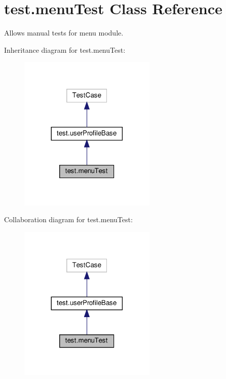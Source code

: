 \hypertarget{classtest_1_1menuTest}{}\section{test.\+menu\+Test Class Reference}
\label{classtest_1_1menuTest}


Allows manual tests for menu module.  




Inheritance diagram for test.\+menu\+Test\+:
\nopagebreak
\begin{figure}[H]
\begin{center}
\leavevmode
\includegraphics[width=185pt]{classtest_1_1menuTest__inherit__graph}
\end{center}
\end{figure}


Collaboration diagram for test.\+menu\+Test\+:
\nopagebreak
\begin{figure}[H]
\begin{center}
\leavevmode
\includegraphics[width=185pt]{classtest_1_1menuTest__coll__graph}
\end{center}
\end{figure}
